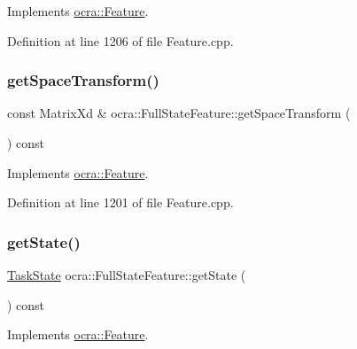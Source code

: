 Implements \hyperlink{classocra_1_1Feature_aeda4c2a5ffe638c3de30f8b91a11450e}{ocra\+::\+Feature}.



Definition at line 1206 of file Feature.\+cpp.

\hypertarget{classocra_1_1FullStateFeature_a2f6672c0d5a13df8fc4f38f011c8c32e}{}\label{classocra_1_1FullStateFeature_a2f6672c0d5a13df8fc4f38f011c8c32e} 
\subsubsection{\texorpdfstring{get\+Space\+Transform()}{getSpaceTransform()}}
{\footnotesize\ttfamily const Matrix\+Xd \& ocra\+::\+Full\+State\+Feature\+::get\+Space\+Transform (\begin{DoxyParamCaption}{ }\end{DoxyParamCaption}) const\hspace{0.3cm}{\ttfamily [virtual]}}



Implements \hyperlink{classocra_1_1Feature_a77eb324fb4da91fd50d0e761d2453ff3}{ocra\+::\+Feature}.



Definition at line 1201 of file Feature.\+cpp.

\hypertarget{classocra_1_1FullStateFeature_aa0e23c8feabb2e6855404cd90032ffbc}{}\label{classocra_1_1FullStateFeature_aa0e23c8feabb2e6855404cd90032ffbc} 
\subsubsection{\texorpdfstring{get\+State()}{getState()}}
{\footnotesize\ttfamily \hyperlink{classocra_1_1TaskState}{Task\+State} ocra\+::\+Full\+State\+Feature\+::get\+State (\begin{DoxyParamCaption}{ }\end{DoxyParamCaption}) const\hspace{0.3cm}{\ttfamily [virtual]}}



Implements \hyperlink{classocra_1_1Feature_a792434ceb793f25874b8fe42ae24c475}{ocra\+::\+Feature}.



